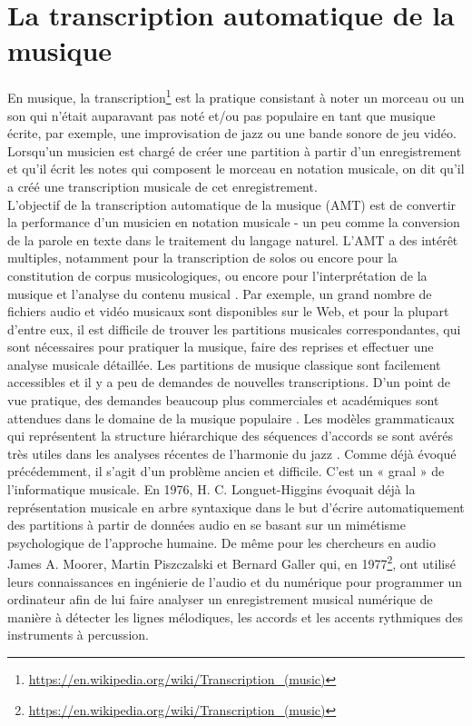 \section{La transcription automatique de la musique}
En musique, la transcription\footnote{\url{
https://en.wikipedia.org/wiki/Transcription_(music)}} est la pratique
consistant à noter un morceau ou un son qui n'était auparavant pas noté et/ou pas populaire en tant que musique écrite, par exemple, une improvisation de jazz ou une bande sonore de jeu vidéo. Lorsqu'un musicien est chargé de créer une partition à partir d'un enregistrement et qu'il écrit les notes qui composent le morceau en notation musicale, on dit qu'il a créé une transcription musicale de cet enregistrement.\\
L'objectif de la transcription automatique de la musique (AMT) \cite{future_directions} est de convertir la performance d'un musicien en notation musicale - un peu comme la conversion de la parole en texte dans le traitement du langage naturel. L’AMT a des intérêt multiples, notamment pour la transcription de solos ou encore pour la constitution de corpus musicologiques, ou encore pour l'interprétation de la musique et l'analyse du contenu musical \cite{SHIBATA2021262}. Par exemple, un grand nombre de fichiers audio et vidéo musicaux sont disponibles sur le Web, et pour la plupart d'entre eux, il est difficile de trouver les partitions musicales correspondantes, qui sont nécessaires pour pratiquer la musique, faire des reprises et effectuer une analyse musicale détaillée. Les partitions de musique classique sont facilement accessibles et il y a peu de demandes de nouvelles transcriptions. D'un point de vue pratique, des demandes beaucoup plus commerciales et académiques sont attendues dans le domaine de la musique populaire \cite{SHIBATA2021262}. Les modèles grammaticaux qui représentent la structure hiérarchique des séquences d'accords se sont avérés très utiles dans les analyses récentes de l'harmonie du jazz \cite{harasimjazz}.
Comme déjà évoqué précédemment, il s’agit d’un problème ancien et difficile. C’est un « graal » de l’informatique musicale. En 1976, H. C. Longuet-Higgins \cite{first_one} évoquait déjà la représentation musicale en arbre syntaxique dans le but d’écrire automatiquement des partitions à partir de données audio en se basant sur un mimétisme psychologique de l’approche humaine. De même pour les chercheurs en audio James A. Moorer, Martin Piszczalski et Bernard Galler qui, en 1977\footnote{\url{https://en.wikipedia.org/wiki/Transcription_(music)}}, ont utilisé leurs connaissances en ingénierie de l’audio et du numérique pour programmer un ordinateur afin de lui faire analyser un enregistrement musical numérique de manière à détecter les lignes mélodiques, les accords et les accents rythmiques des instruments à percussion.\\
